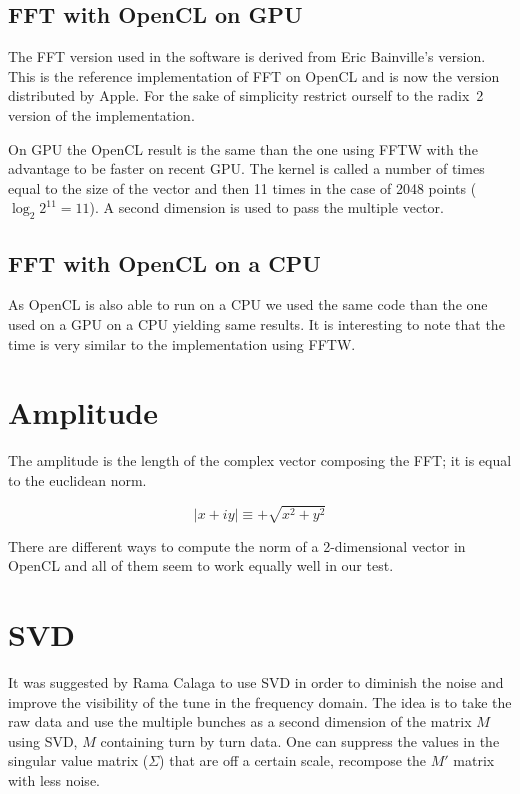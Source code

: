 \subsection{FFT with OpenCL on GPU}

The \gls{FFT} version used in the software is derived from Eric Bainville's version. This is the reference implementation of \gls{FFT} on \gls{OpenCL} and is now the version distributed by Apple\cite{bainville11}. For the sake of simplicity restrict ourself to the radix~2 version of the implementation.

On \gls{GPU} the \gls{OpenCL} result is the same than the one using \gls{FFTW} with the advantage to be faster on recent \gls{GPU}. The kernel is called a number of times equal to the size of the vector and then 11 times in the case of 2048 points ($\log_{2}{2^{11}} = 11$). A second dimension is used to pass the multiple vector.

\subsection{FFT with OpenCL on a CPU}

As \gls{OpenCL} is also able to run on a \gls{CPU} we used the same code than the one used on a \gls{GPU} on a \gls{CPU} yielding same results. It is interesting to note that the time is very similar to the implementation using \gls{FFTW}.

\section{Amplitude}
\label{sec:amplitude}

The amplitude is the length of the complex vector composing the \gls{FFT}; it is equal to the euclidean norm. 

$$\mid x + i y \mid \equiv +\sqrt{x^2 + y^2}$$ 

There are different ways to compute the norm of a 2-dimensional vector in \gls{OpenCL} and all of them seem to work equally well in our test.

\section{SVD}
\label{sec:SVD}

It was suggested by Rama Calaga to use \gls{SVD} in order to diminish the noise and improve the visibility of the tune in the frequency domain. The idea is to take the raw data and use the multiple bunches as a second dimension of the matrix $M$ using SVD, $M$ containing turn by turn data. One can suppress the values in the singular value matrix ($\Sigma$) that are off a certain scale, recompose the $M'$ matrix with less noise.

